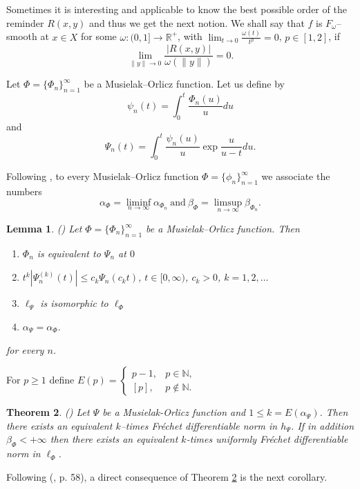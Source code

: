 \documentclass[12pt]{article}
\theoremstyle{thmstyleone}%
\newtheorem{theorem}{Theorem}
\newtheorem{lemma}[theorem]{Lemma}
\theoremstyle{thmstyletwo}%
\theoremstyle{thmstylethree}%
\begin{document}
{Sometimes it is interesting and applicable to know the best possible 
order of the reminder $R(x,y)$ and thus we get the next notion.
We shall say that $f$ is 
$F_{\omega}$--smooth at $x\in X$ for some $\omega :(0,1]\to\mathbb{R}^{+}$, with $\lim_{t\to
	0}\frac{\omega (t)}{t^p}=0$, $p\in [1,2]$, if
$$
\lim_{\|y\|\to 0}\frac{|R(x,y)|}{\omega(\|y\|)}=0.
$$

Let $\Phi =\{\Phi_n\}_{n=1}^\infty$ be a Musielak--Orlicz function. Let us define
by 
$$
\psi_n(t)=\displaystyle\int_0^t\frac{\Phi_n (u)}{u}du
$$ 
and
$$
\Psi_n(t)=\displaystyle\int_0^t\displaystyle\frac{\psi_n(u)}{u}\exp \frac{u}{u-t}du.
$$

Following \cite{Maleev-Zlatanov-02}, to every Musielak--Orlicz function $\Phi =\{\phi_n\}_{n=1}^\infty$
we associate the numbers 
$$
\alpha_\Phi =\liminf_{n\to\infty}\alpha_{\Phi_n}\ \mbox{and}\
\beta_\Phi =\limsup_{n\to\infty}\beta_{\Phi_n}.
$$

\begin{lemma}\label{lemma:3}(\cite{Maleev-Zlatanov-02})
	Let $\Phi =\{\Phi_n\}_{n=1}^\infty$ be a Musielak--Orlicz function.
	Then 
	\begin{enumerate}
		\item  $\Phi_n$ is equivalent to $\Psi_n$ at $0$
		\item $t^k|\Psi_n^{(k)}(t)|\le c_k\Psi_n(c_kt)$, $t\in
		[0,\infty )$, $c_k>0$, $k=1,2,\dots$
		\item $\ell_\Psi$ is isomorphic to $\ell_\Phi$
		\item $\alpha_\Psi=\alpha_\Phi$.
	\end{enumerate}
	for every $n$.
\end{lemma}

For $p\geq 1$ define $E(p)=\left\{
\begin{array}{ll}
	p-1,&p\in\mathbb{N} ,\\[12pt]
	[p],&p\not\in\mathbb{N} .
\end{array}
\right.$ 

\begin{theorem}\label{theorem:4}(\cite{Maleev-Zlatanov-02})
	Let $\Psi$ be a Musielak-Orlicz function and $1\le k=E(\alpha_\Psi )$.
	Then there exists an equivalent $k$--times Fr\'echet
	differentiable norm in $h_\Psi$. If in addition $\beta_\Phi<+\infty$ then there exists
	an equivalent $k$-times uniformly Fr\'{e}chet differentiable norm in $\ell_\Phi$.
\end{theorem}

Following (\cite{Deville-Godefroy-Zizler}, p. 58), a direct consequence of Theorem \ref{theorem:4} is the next corollary. 

}
\end{document}
